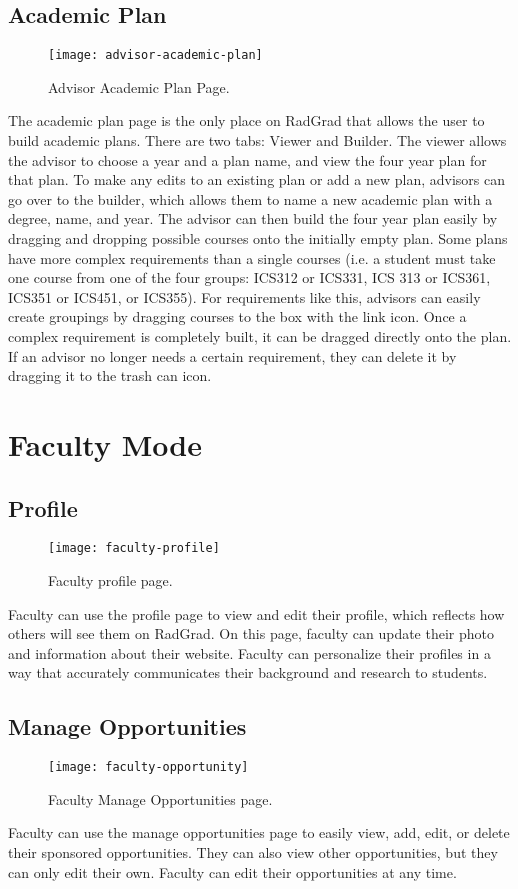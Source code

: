 \subsection{Academic Plan}
\begin{figure}[h]
\centering
\texttt{[image: advisor-academic-plan]}
\caption{Advisor Academic Plan Page.}
\end{figure}
The academic plan page is the only place on RadGrad that allows the user to build academic plans. There are two tabs: Viewer and Builder. The viewer allows the advisor to choose a year and a plan name, and view the four year plan for that plan. To make any edits to an existing plan or add a new plan, advisors can go over to the builder, which allows them to name a new academic plan with a degree, name, and year. The advisor can then build the four year plan easily by dragging and dropping possible courses onto the initially empty plan. Some plans have more complex requirements than a single courses (i.e. a student must take one course from one of the four groups: ICS312 or ICS331, ICS 313 or ICS361, ICS351 or ICS451, or ICS355). For requirements like this, advisors can easily create groupings by dragging courses to the box with the link icon. Once a complex requirement is completely built, it can be dragged directly onto the plan. If an advisor no longer needs a certain requirement, they can delete it by dragging it to the trash can icon. 

\section{Faculty Mode}
\subsection{Profile}
\begin{figure}[h]
\centering
\texttt{[image: faculty-profile]}
\caption{Faculty profile page.}
\end{figure}
Faculty can use the profile page to view and edit their profile, which reflects how others will see them on RadGrad. On this page, faculty can update their photo and information about their website. Faculty can personalize their profiles in a way that accurately communicates their background and research to students. 
\subsection{Manage Opportunities}
\begin{figure}[h]
\centering
\texttt{[image: faculty-opportunity]}
\caption{Faculty Manage Opportunities page.}
\end{figure}
Faculty can use the manage opportunities page to easily view, add, edit, or delete their sponsored opportunities. They can also view other opportunities, but they can only edit their own. Faculty can edit their opportunities at any time.
